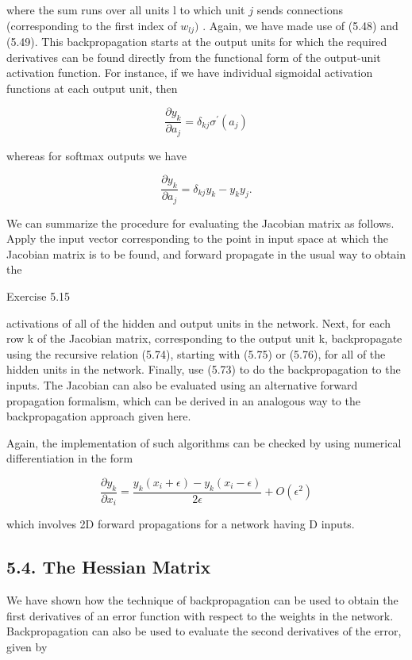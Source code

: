 \documentclass[
  10
]{article}
\begin{document}
where the sum runs over all units l to which unit \(j\) sends
connections (corresponding to the first index of \(w _ { l j } )\) .
Again, we have made use of (5.48) and (5.49). This backpropagation
starts at the output units for which the required derivatives can be
found directly from the functional form of the output-unit activation
function. For instance, if we have individual sigmoidal activation
functions at each output unit, then

\[
\frac {\partial y _ {k}}{\partial a _ {j}} = \delta_ {k j} \sigma^ {\prime} (a _ {j})\tag{5.75}
\]

whereas for softmax outputs we have

\[
\frac {\partial y _ {k}}{\partial a _ {j}} = \delta_ {k j} y _ {k} - y _ {k} y _ {j}.\tag{5.76}
\]

We can summarize the procedure for evaluating the Jacobian matrix as
follows. Apply the input vector corresponding to the point in input
space at which the Jacobian matrix is to be found, and forward propagate
in the usual way to obtain the

Exercise 5.15

activations of all of the hidden and output units in the network. Next,
for each row k of the Jacobian matrix, corresponding to the output unit
k, backpropagate using the recursive relation (5.74), starting with
(5.75) or (5.76), for all of the hidden units in the network. Finally,
use (5.73) to do the backpropagation to the inputs. The Jacobian can
also be evaluated using an alternative forward propagation formalism,
which can be derived in an analogous way to the backpropagation approach
given here.

Again, the implementation of such algorithms can be checked by using
numerical differentiation in the form

\[
\frac {\partial y _ {k}}{\partial x _ {i}} = \frac {y _ {k} (x _ {i} + \epsilon) - y _ {k} (x _ {i} - \epsilon)}{2 \epsilon} + O (\epsilon^ {2})\tag{5.77}
\]

which involves 2D forward propagations for a network having D inputs.

\subsection{5.4. The Hessian Matrix}\label{the-hessian-matrix}

We have shown how the technique of backpropagation can be used to obtain
the first derivatives of an error function with respect to the weights
in the network. Backpropagation can also be used to evaluate the second
derivatives of the error, given by
\end{document}
